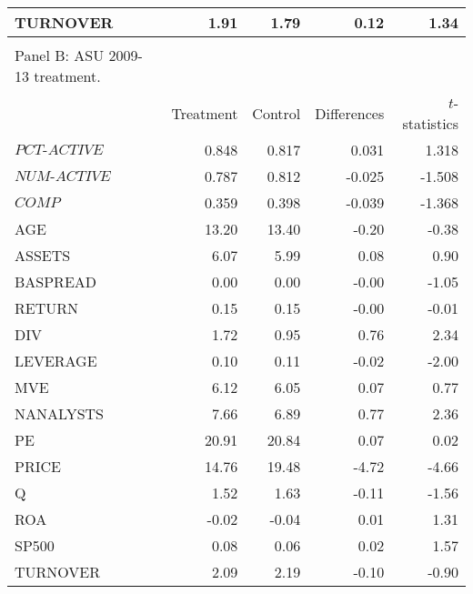 \begin{longtable}{lrrrr}
  TURNOVER & 1.91 & 1.79 & 0.12 & 1.34 \\ 
   \hline \\
   Panel B: ASU 2009-13 treatment.\\
   \hline
 & Treatment & Control & Differences & $t$-statistics \\ 
  \hline
  $PCT\text{-}ACTIVE$ & 0.848 & 0.817 & 0.031 & 1.318 \\
$NUM\text{-}ACTIVE$ & 0.787 & 0.812 & -0.025 & -1.508\\
$COMP$ & 0.359 & 0.398 & -0.039 & -1.368\\
AGE & 13.20 & 13.40 & -0.20 & -0.38 \\ 
  ASSETS & 6.07 & 5.99 & 0.08 & 0.90 \\ 
  BASPREAD & 0.00 & 0.00 & -0.00 & -1.05 \\ 
  RETURN & 0.15 & 0.15 & -0.00 & -0.01 \\ 
  DIV & 1.72 & 0.95 & 0.76 & 2.34 \\ 
  LEVERAGE & 0.10 & 0.11 & -0.02 & -2.00 \\ 
  MVE & 6.12 & 6.05 & 0.07 & 0.77 \\ 
  NANALYSTS & 7.66 & 6.89 & 0.77 & 2.36 \\ 
  PE & 20.91 & 20.84 & 0.07 & 0.02 \\ 
  PRICE & 14.76 & 19.48 & -4.72 & -4.66 \\ 
  Q & 1.52 & 1.63 & -0.11 & -1.56 \\ 
  ROA & -0.02 & -0.04 & 0.01 & 1.31 \\ 
  SP500 & 0.08 & 0.06 & 0.02 & 1.57 \\ 
  TURNOVER & 2.09 & 2.19 & -0.10 & -0.90 \\ 
   \hline
\end{longtable}
